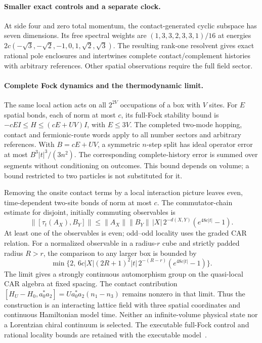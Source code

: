 \paragraph{Smaller exact controls and a separate clock.}
At side four and zero total momentum, the contact-generated cyclic
subspace has seven dimensions. Its free spectral weights are
$(1,3,3,2,3,3,1)/16$ at energies
$2c(-\sqrt3,-\sqrt2,-1,0,1,\sqrt2,\sqrt3)$.
The resulting rank-one resolvent gives exact rational pole enclosures
and intertwines complete contact/complement histories with arbitrary
references. Other spatial observations require the full field sector.

\paragraph{Complete Fock dynamics and the thermodynamic limit.}
The same local action acts on all $2^{2V}$ occupations of a box with $V$
sites. For $E$ spatial bonds, each of norm at most $c$, its full-Fock
stability bound is $-cE I\le H\le(cE+UV)I$, with $E\le3V$.
The completed two-mode hopping, contact and fermionic-route words apply to
all number sectors and arbitrary references. With $B=cE+UV$, a symmetric
$n$-step split has ideal operator error at most $B^3|t|^3/(3n^2)$.
The corresponding complete-history error is summed over segments without
conditioning on outcomes. This bound depends on volume; a bound restricted
to two particles is not substituted for it.

Removing the onsite contact terms by a local interaction picture leaves
even, time-dependent two-site bonds of norm at most $c$. The commutator-chain
estimate for disjoint, initially commuting observables is
\[
 \|[\tau_t(A_X),B_Y]\|
 \le \|A_X\|\|B_Y\|\,|X|\,2^{-d(X,Y)}(e^{48c|t|}-1).
\]
At least one of the observables is even; odd--odd locality uses the graded
CAR relation. For a normalized observable in a radius-$r$ cube and strictly
padded radius $R>r$, the comparison to any larger box is bounded by
\[
 \min\{2,\,6c|X|(2R+1)^2|t|\,2^{-(R-r)}(e^{48c|t|}-1)\}.
\]
The limit gives a strongly continuous automorphism group on the quasi-local
CAR algebra at fixed spacing. The contact contribution
$[H_U-H_0,a_0^*a_2]=U a_0^*a_2(n_1-n_3)$ remains nonzero in that limit.
Thus the construction is an interacting lattice field with three spatial
coordinates and continuous Hamiltonian model time. Neither an infinite-volume
physical state nor a Lorentzian chiral continuum is selected. The executable
full-Fock control and rational locality bounds are retained with the executable
model~\cite{mREADME}.

